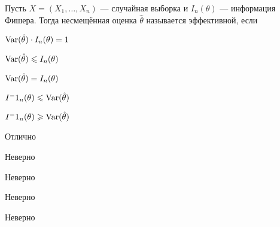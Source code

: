 
\begin{question}
Пусть \(X = (X_1, \ldots , X_n)\) — случайная выборка и
\(I_n(\theta)\) — информация Фишера. Тогда несмещённая оценка
\(\hat{\theta}\) называется эффективной, если
\begin{answerlist}
  \item \(\operatorname{Var}(\hat\theta) \cdot I_n (\theta) = 1\)
  \item \(\operatorname{Var}(\hat\theta) \leqslant I_n (\theta)\)
  \item \(\operatorname{Var}(\hat\theta) = I_n (\theta)\)
  \item \(I^-1_n (\theta) \leqslant \operatorname{Var}(\hat\theta)\)
  \item \(I^-1_n (\theta) \geqslant \operatorname{Var}(\hat\theta)\)
\end{answerlist}
\end{question}

\begin{solution}
\begin{answerlist}
  \item Отлично
  \item Неверно
  \item Неверно
  \item Неверно
  \item Неверно
\end{answerlist}
\end{solution}

